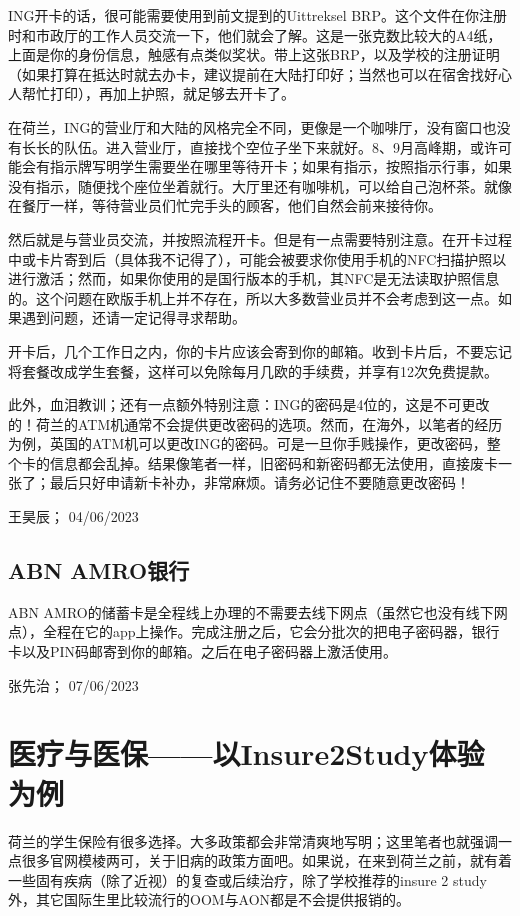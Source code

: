 ING开卡的话，很可能需要使用到前文提到的Uittreksel BRP。这个文件在你注册时和市政厅的工作人员交流一下，他们就会了解。这是一张克数比较大的A4纸，上面是你的身份信息，触感有点类似奖状。带上这张BRP，以及学校的注册证明（如果打算在抵达时就去办卡，建议提前在大陆打印好；当然也可以在宿舍找好心人帮忙打印），再加上护照，就足够去开卡了。

在荷兰，ING的营业厅和大陆的风格完全不同，更像是一个咖啡厅，没有窗口也没有长长的队伍。进入营业厅，直接找个空位子坐下来就好。8、9月高峰期，或许可能会有指示牌写明学生需要坐在哪里等待开卡；如果有指示，按照指示行事，如果没有指示，随便找个座位坐着就行。大厅里还有咖啡机，可以给自己泡杯茶。就像在餐厅一样，等待营业员们忙完手头的顾客，他们自然会前来接待你。

然后就是与营业员交流，并按照流程开卡。但是有一点需要特别注意。在开卡过程中或卡片寄到后（具体我不记得了），可能会被要求你使用手机的NFC扫描护照以进行激活；然而，如果你使用的是国行版本的手机，其NFC是无法读取护照信息的。这个问题在欧版手机上并不存在，所以大多数营业员并不会考虑到这一点。如果遇到问题，还请一定记得寻求帮助。

开卡后，几个工作日之内，你的卡片应该会寄到你的邮箱。收到卡片后，不要忘记将套餐改成学生套餐，这样可以免除每月几欧的手续费，并享有12次免费提款。

此外，血泪教训；还有一点额外特别注意：ING的密码是4位的，这是不可更改的！荷兰的ATM机通常不会提供更改密码的选项。然而，在海外，以笔者的经历为例，英国的ATM机可以更改ING的密码。可是一旦你手贱操作，更改密码，整个卡的信息都会乱掉。结果像笔者一样，旧密码和新密码都无法使用，直接废卡一张了；最后只好申请新卡补办，非常麻烦。请务必记住不要随意更改密码！
\begin{flushright}
王昊辰； 04/06/2023
\end{flushright}
\subsection{ABN AMRO银行}
ABN AMRO的储蓄卡是全程线上办理的不需要去线下网点（虽然它也没有线下网点），全程在它的app上操作。完成注册之后，它会分批次的把电子密码器，银行卡以及PIN码邮寄到你的邮箱。之后在电子密码器上激活使用。
\begin{flushright}
张先治； 07/06/2023

\end{flushright}


\vspace{\betsubsec} %
\section{医疗与医保——以Insure2Study体验为例}
荷兰的学生保险有很多选择。大多政策都会非常清爽地写明；这里笔者也就强调一点很多官网模棱两可，关于旧病的政策方面吧。如果说，在来到荷兰之前，就有着一些固有疾病（除了近视）的复查或后续治疗，除了学校推荐的insure 2 study外，其它国际生里比较流行的OOM与AON都是不会提供报销的。

